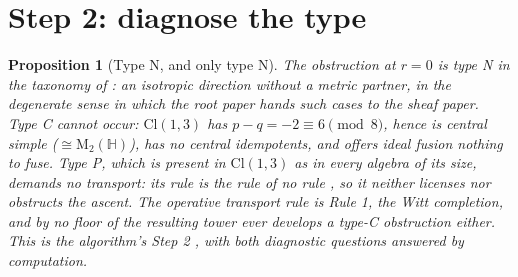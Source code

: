 \documentclass[11pt]{article}
\newtheorem{proposition}[theorem]{Proposition}
\theoremstyle{definition}
\theoremstyle{plain}
\providecommand{\Cl}{}\renewcommand{\Cl}{\mathrm{Cl}}
\providecommand{\HH}{}\renewcommand{\HH}{\mathbb{H}}
\providecommand{\Mat}{}\renewcommand{\Mat}{\mathrm{M}}
\begin{document}
\section{Step 2: diagnose the type}

\begin{proposition}[Type N, and only type N]\label{c:singularity.type-n-only-type-n}
The obstruction at $r = 0$ is type N in the taxonomy of \cite[\S 3]{ButlerT1}: an isotropic direction without a metric partner, in the degenerate sense in which the root paper hands such cases to the sheaf paper. Type C cannot occur: $\Cl(1,3)$ has $p - q = -2 \equiv 6 \pmod 8$, hence is central simple ($\cong \Mat_2(\HH)$), has no central idempotents, and offers ideal fusion nothing to fuse. Type P, which is present in $\Cl(1,3)$ as in every algebra of its size, demands no transport: its rule is the rule of no rule \cite[\S 6, Prop.~6.1]{ButlerT1}, so it neither licenses nor obstructs the ascent. The operative transport rule is Rule 1, the Witt completion, and by \cite[Thm.~3.6]{ButlerT3} no floor of the resulting tower ever develops a type-C obstruction either. This is the algorithm's Step 2 \cite[\S 8.1, Step 2]{ButlerT1}, with both diagnostic questions answered by computation.
\end{proposition}
\end{document}
